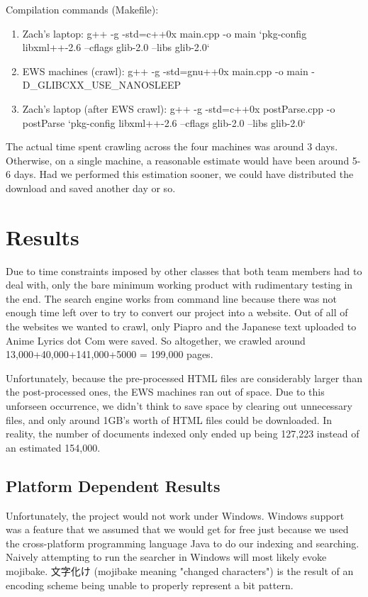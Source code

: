 \documentclass{acm} %
\begin{document}
\begin{CJK}{UTF8}{zhsong}
Compilation commands (Makefile):

\begin{enumerate}
 \item Zach's laptop: g++ -g -std=c++0x main.cpp -o main `pkg-config libxml++-2.6 --cflags glib-2.0 --libs glib-2.0`
 \item EWS machines (crawl): g++ -g -std=gnu++0x main.cpp -o main -D\_GLIBCXX\_USE\_NANOSLEEP
 \item Zach's laptop (after EWS crawl): g++ -g -std=c++0x postParse.cpp -o postParse `pkg-config libxml++-2.6 --cflags glib-2.0 --libs glib-2.0`
\end{enumerate}

The actual time spent crawling across the four machines was around 3 days. Otherwise, on a single machine, a reasonable estimate would have been around 5-6 days. Had we performed this estimation sooner, we could have distributed the download and saved another day or so.

\section{Results}

Due to time constraints imposed by other classes that both team members had to deal with, only the bare minimum working product with rudimentary testing in the end. The search engine works from command line because there was not enough time left over to try to convert our project into a website. Out of all of the websites we wanted to crawl, only Piapro and the Japanese text uploaded to Anime Lyrics dot Com were saved. So altogether, we crawled around 13,000+40,000+141,000+5000 = 199,000 pages.

Unfortunately, because the pre-processed HTML files are considerably larger than the post-processed ones, the EWS machines ran out of space. Due to this unforseen occurrence, we didn't think to save space by clearing out unnecessary files, and only around 1GB's worth of HTML files could be downloaded. In reality, the number of documents indexed only ended up being 127,223 instead of an estimated 154,000.

\subsection{Platform Dependent Results}

Unfortunately, the project would not work under Windows. Windows support was a feature that we assumed that we would get for free just because we used the cross-platform programming language Java to do our indexing and searching. Naively attempting to run the searcher in Windows will most likely evoke mojibake. 文字化け (mojibake meaning "changed characters") is the result of an encoding scheme being unable to properly represent a bit pattern.


\end{CJK}
\end{document}
